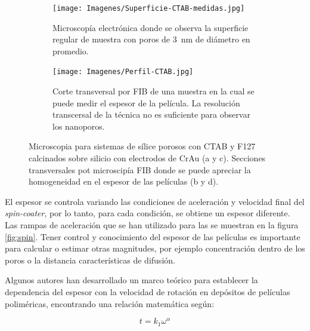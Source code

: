 \begin{figure}[bh!]
\begin{subfigure}[t]{0.495\textwidth}
			       		\label{fig:sem_homogeneidad2}
			       		\end{subfigure}	
			       	\begin{subfigure}[t]{0.495\textwidth}
			        	\texttt{[image: Imagenes/Superficie-CTAB-medidas.jpg]}
			       		\caption{Microscopía electrónica donde se observa la superficie regular de muestra \pdmC\space con poros de \SI{3}{nm} de diámetro en promedio.}
			       		\label{fig:sem_homogeneidad3}
			       		\end{subfigure}
					\begin{subfigure}[t]{0.49\textwidth}
			 	   	    \texttt{[image: Imagenes/Perfil-CTAB.jpg]}
			       		\caption{Corte transversal por FIB de una muestra \pdmC\space en la cual se puede medir el espesor de la película. La resolución transcersal de la técnica no es suficiente para observar los nanoporos.}
			       		\label{fig:sem_homogeneidad4}
			       		\end{subfigure}	
					
					\vspace{-2mm}
					 \caption[MEB \pdmC\space y \pdmF.]{Microscopia para sistemas de sílice porosos con CTAB y F127 calcinados sobre silicio con electrodos de Cr\textbar Au (a y c). Secciones transversales pot microscipía FIB donde se puede apreciar la homogeneidad en el espesor de las películas (b y d).}
					 \label{fig:sem_homogeneidad}	
				     \vspace*{0.2cm}
				     \end{figure}
 	
		 El espesor se controla variando las condiciones de aceleración y velocidad final del \textit{spin-coater}, por lo tanto, para cada condición, se obtiene un espesor diferente. Las rampas de aceleración que se han utilizado para las \pdm\space se muestran en la figura \ref{fig:spin}. Tener control y conocimiento del espesor de las películas es importante para calcular o estimar otras magnitudes, por ejemplo concentración dentro de los poros o la distancia características de difusión. 

		 Algunos autores han desarrollado un marco teórico para establecer la dependencia del espesor con la velocidad de rotación en depósitos de películas poliméricas, encontrando una relación matemática según: \cite{Norrman2005,Meyerhofer1978,Bornside1989,Lora1990}
	
			\begin{equation}
			  t = k_1 \omega^{\alpha}
			  \label{eq:spin_meso}
			  \end{equation}		
	
